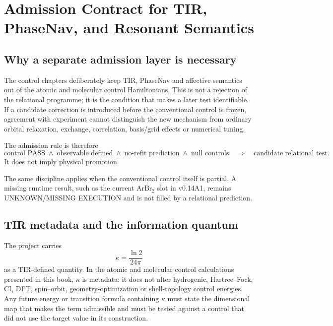 \chapter{Admission Contract for TIR, PhaseNav, and Resonant Semantics}
\label{ch:relational-admission}

\section{Why a separate admission layer is necessary}
The control chapters deliberately keep TIR, PhaseNav and affective semantics out of the atomic and molecular control Hamiltonians.  This is not a rejection of the relational programme; it is the condition that makes a later test identifiable.  If a candidate correction is introduced before the conventional control is frozen, agreement with experiment cannot distinguish the new mechanism from ordinary orbital relaxation, exchange, correlation, basis/grid effects or numerical tuning.

The admission rule is therefore
\begin{equation}
\text{control PASS}\;\land\;\text{observable defined}\;\land\;\text{no-refit prediction}\;\land\;\text{null controls}
\quad\Longrightarrow\quad
\text{candidate relational test}.
\end{equation}
It does not imply physical promotion.

The same discipline applies when the conventional control itself is partial.  A missing runtime result, such as the current ArBr$_2$ slot in v0.14A1, remains UNKNOWN/MISSING EXECUTION and is not filled by a relational prediction.

\section{TIR metadata and the information quantum}
The project carries
\begin{equation}
\kappa=\frac{\ln 2}{24\pi}
\end{equation}
as a TIR-defined quantity.  In the atomic and molecular control calculations presented in this book, $\kappa$ is metadata: it does not alter hydrogenic, Hartree--Fock, CI, DFT, spin--orbit, geometry-optimization or shell-topology control energies.  Any future energy or transition formula containing $\kappa$ must state the dimensional map that makes the term admissible and must be tested against a control that did not use the target value in its construction.

